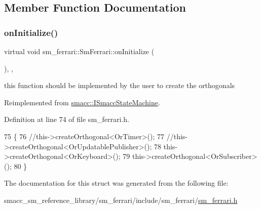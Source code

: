 \subsection{Member Function Documentation}
\mbox{\label{structsm__ferrari_1_1SmFerrari_a024d7b61edb9121eb68bfbcc20618636}} 
\subsubsection{\texorpdfstring{on\+Initialize()}{onInitialize()}}
{\footnotesize\ttfamily virtual void sm\+\_\+ferrari\+::\+Sm\+Ferrari\+::on\+Initialize (\begin{DoxyParamCaption}{ }\end{DoxyParamCaption})\hspace{0.3cm}{\ttfamily [inline]}, {\ttfamily [override]}, {\ttfamily [virtual]}}



this function should be implemented by the user to create the orthogonals 



Reimplemented from \hyperlink{classsmacc_1_1ISmaccStateMachine_ac2982c6c8283663e5e1e8a7c82f511ec}{smacc\+::\+I\+Smacc\+State\+Machine}.



Definition at line 74 of file sm\+\_\+ferrari.\+h.


\begin{DoxyCode}
75     \{
76         \textcolor{comment}{//this->createOrthogonal<OrTimer>();}
77         \textcolor{comment}{//this->createOrthogonal<OrUpdatablePublisher>();}
78         this->createOrthogonal<OrKeyboard>();
79         this->createOrthogonal<OrSubscriber>();
80     \}
\end{DoxyCode}


The documentation for this struct was generated from the following file\+:\begin{DoxyCompactItemize}
\item 
smacc\+\_\+sm\+\_\+reference\+\_\+library/sm\+\_\+ferrari/include/sm\+\_\+ferrari/\hyperlink{sm__ferrari_8h}{sm\+\_\+ferrari.\+h}\end{DoxyCompactItemize}
